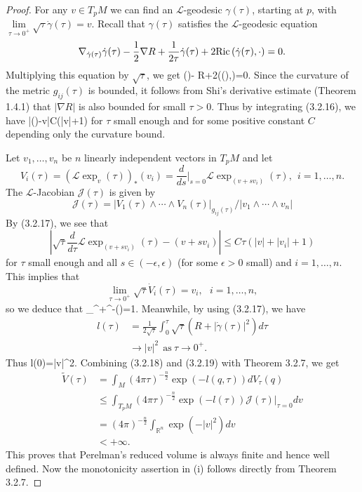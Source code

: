\begin{proof}
For any $v\in T_pM$ we can find an $\mathcal{L}$-geodesic
$\gamma(\tau)$, starting at $p$, with
$\lim\limits_{\tau\rightarrow0^+}\sqrt{\tau}\dot{\gamma}(\tau)=v$.
Recall that $\gamma(\tau)$ satisfies the $\mathcal{L}$-geodesic
equation
$$
\nabla_{\dot{\gamma}(\tau)}\dot{\gamma}(\tau)-\frac{1}{2}\nabla
R+\frac{1}{2\tau}\dot{\gamma}(\tau)+2{\rm Ric}\,(\dot{\gamma}(\tau),\cdot)=0.
$$
Multiplying this equation by $\sqrt{\tau}$, we get \be
{}(\sqrt{\tau}\dot{\gamma})-\sqrt{\tau}\nabla
R+2\Ric(\sqrt{\tau}\dot{\gamma}(\tau),\cdot)=0.%
\ee Since the curvature of the metric $g_{ij}(\tau)$ is bounded,
it follows from Shi's derivative estimate (Theorem 1.4.1) that
$|\nabla R|$ is also bounded for small $\tau>0$. Thus by
integrating (3.2.16), we have \be
|\sqrt{\tau}\dot{\gamma}(\tau)-v|\leq C\tau(|v|+1) %
\ee for $\tau$ small enough and for some positive constant $C$
depending only the curvature bound.

Let $v_1,\ldots,v_n$ be $n$ linearly independent vectors in $T_pM$
and let
$$
V_i(\tau)=(\mathcal{L}\exp_v(\tau))_*(v_i)
=\frac{d}{ds}|_{s=0}\mathcal{L}\exp_{(v+sv_i)}(\tau),\ \
i=1,\ldots,n.
$$
The $\mathcal{L}$-Jacobian $\mathcal{J}(\tau)$ is given by
$$
\mathcal{J}(\tau)=|V_1(\tau)\wedge\cdots\wedge
V_n(\tau)|_{g_{ij}(\tau)}/|v_1\wedge\cdots\wedge v_n|
$$
By (3.2.17), we see that
$$
\left|\sqrt{\tau}\frac{d}{d\tau}\mathcal{L}
\exp_{(v+sv_i)}(\tau)-(v+sv_i)\right| \leq C\tau (|v|+|v_i|+1)
$$
for $\tau$ small enough and all $s\in(-\epsilon,\epsilon)$ (for
some $\epsilon>0$ small) and $i=1,\ldots,n$. This implies that
$$
\lim\limits_{\tau\rightarrow0^+}\sqrt{\tau}\dot{V}_i(\tau) =v_i,\
\ \ i=1,\ldots,n,
$$
so we deduce that \be
\lim\limits_{\tau{}^+}\tau^{-}(\tau)=1.
\ee Meanwhile, by using (3.2.17), we have
\begin{displaymath}
\begin{split}
l(\tau)&  =\frac{1}{2\sqrt{\tau}}\int_0^\tau\sqrt{\tau}
(R+|\dot{\gamma}(\tau)|^2)d\tau\\
&  \rightarrow |v|^2\ \ \text{as}\ \tau\rightarrow0^+.
\end{split}
\end{displaymath}
Thus \be
l(0)=|v|^2.%
\ee Combining (3.2.18) and (3.2.19) with Theorem 3.2.7, we get
\begin{displaymath}
\begin{split}
\tilde{V}(\tau)
&  =\int_M(4\pi\tau)^{-\frac{n}{2}}\exp(-l(q,\tau))dV_{\tau}(q) \\
&  \leq\int_{T_pM}(4\pi\tau)^{-\frac{n}{2}}
\exp(-l(\tau))\mathcal{J}(\tau)|_{\tau=0}dv\\
&  =(4\pi)^{-\frac{n}{2}}\int_{\mathbb{R}^n}\exp(-|v|^2)dv\\
&  <+\infty.
\end{split}
\end{displaymath}
This proves that Perelman's reduced volume is always finite and
hence well defined. Now the monotonicity assertion in (i) follows
directly from Theorem 3.2.7.


\end{proof}
